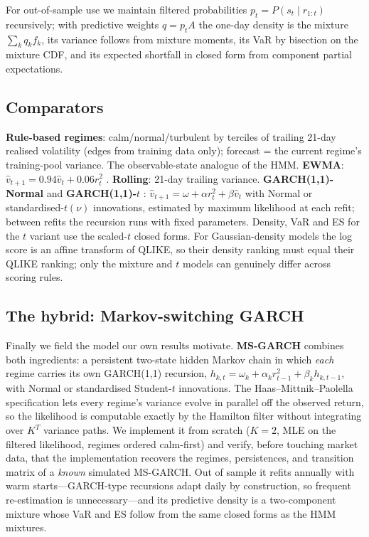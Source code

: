 \documentclass[11pt]{article}
\begin{document}
For out-of-sample use we maintain filtered probabilities
$p_t = P(s_t\mid r_{1:t})$ recursively; with predictive weights $q=p_tA$
the one-day density is the mixture $\sum_k q_k f_k$, its variance follows
from mixture moments, its VaR by bisection on the mixture CDF, and its
expected shortfall in closed form from component partial expectations.

\subsection{Comparators}
\textbf{Rule-based regimes}: calm/normal/turbulent by terciles of trailing
21-day realised volatility (edges from training data only); forecast = the
current regime's training-pool variance. The observable-state analogue of
the HMM. \textbf{EWMA}: $\hat v_{t+1}=0.94\hat v_t + 0.06 r_t^2$
\citep{riskmetrics1996}. \textbf{Rolling}: 21-day trailing variance.
\textbf{GARCH(1,1)-Normal} and \textbf{GARCH(1,1)-$t$}
\citep{bollerslev1986}: $\hat v_{t+1}=\omega+\alpha r_t^2+\beta\hat v_t$
with Normal or standardised-$t(\nu)$ innovations, estimated by maximum
likelihood at each refit; between refits the recursion runs with fixed
parameters. Density, VaR and ES for the $t$ variant use the scaled-$t$
closed forms. For Gaussian-density models the log score is an affine
transform of QLIKE, so their density ranking must equal their QLIKE
ranking; only the mixture and $t$ models can genuinely differ across
scoring rules.

\subsection{The hybrid: Markov-switching GARCH}\label{sec:hybridmodel}
Finally we field the model our own results motivate. \textbf{MS-GARCH}
\citep{haas2004} combines both ingredients: a persistent two-state hidden
Markov chain in which \emph{each} regime carries its own GARCH(1,1)
recursion, $h_{k,t} = \omega_k + \alpha_k r_{t-1}^2 + \beta_k h_{k,t-1}$,
with Normal or standardised Student-$t$ innovations. The
Haas--Mittnik--Paolella specification lets every regime's variance evolve
in parallel off the observed return, so the likelihood is computable
exactly by the Hamilton filter without integrating over $K^T$ variance
paths. We implement it from scratch ($K{=}2$, MLE on the filtered
likelihood, regimes ordered calm-first) and verify, before touching market
data, that the implementation recovers the regimes, persistences, and
transition matrix of a \emph{known} simulated MS-GARCH. Out of sample it
refits annually with warm starts---GARCH-type recursions adapt daily by
construction, so frequent re-estimation is unnecessary---and its
predictive density is a two-component mixture whose VaR and ES follow from
the same closed forms as the HMM mixtures.
\end{document}
